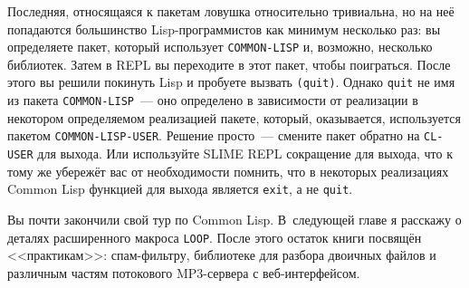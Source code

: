Последняя, относящаяся к пакетам ловушка относительно тривиальна, но на неё попадаются
большинство Lisp-программистов как минимум несколько раз: вы определяете пакет, который
использует \lstinline{COMMON-LISP} и, возможно, несколько библиотек. Затем в REPL вы переходите
в этот пакет, чтобы поиграться. После этого вы решили покинуть Lisp и пробуете вызвать
\lstinline{(quit)}. Однако \lstinline{quit} не имя из пакета \lstinline{COMMON-LISP}~--- оно определено в
зависимости от реализации в некотором определяемом реализацией пакете, который, оказывается,
используется пакетом \lstinline{COMMON-LISP-USER}.  Решение просто~--- смените пакет обратно на
\lstinline{CL-USER} для выхода. Или используйте SLIME REPL сокращение для выхода, что к тому
же убережёт вас от необходимости помнить, что в некоторых реализациях Common Lisp
функцией для выхода является \lstinline{exit}, а не \lstinline{quit}.

Вы почти закончили свой тур по Common Lisp. В~следующей главе я расскажу о деталях
расширенного макроса \lstinline{LOOP}. После этого остаток книги посвящён <<практикам>>:
спам-фильтру, библиотеке для разбора двоичных файлов и различным частям потокового MP3-сервера
с веб-интерфейсом.

